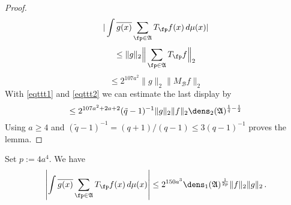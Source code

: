 \begin{proof}
 \begin{equation}
     |\int \overline{g(x)} \sum_{\fp \in \mathfrak{A}} T_{\fp} f(x)\, d\mu(x)|
\end{equation}
 \begin{equation}
     \le \|g\|_2 \Big\| \sum_{\fp \in \mathfrak{A}} T_{\fp} f \Big\|_2
\end{equation}
 \begin{equation}
     \le 2^{107a^2}\|g\|_2 \| M_{\mathcal{B}}f \|_2
\end{equation}
With \eqref{eqttt1} and
\eqref{eqttt2} we can estimate the last display by
\begin{equation}
    \le 2^{107a^2+2a+2}(\tilde{q}-1)^{-1} \|g\|_2 \|f\|_2\dens_2(\mathfrak{A})^{\frac 1{\tilde{q}}-\frac 12}
\end{equation}
Using $a\ge 4$ and
$(\tilde q - 1)^{-1} = (q+1)/(q-1) \le 3(q-1)^{-1}$
proves the lemma.
\end{proof}


\begin{lemma}\label{dens1-antichain}
Set $p:=4a^4$. We have
    \begin{equation}\label{eqttt3}
  \left|\int \overline{g(x)} \sum_{\fp \in \mathfrak{A}} T_{\fp} f(x)\, d\mu(x)\right|\le
   2^{150a^3}\dens_1(\mathfrak{A})^{\frac 1{2p}} \|f\|_2\|g\|_2\,.
\end{equation}
\end{lemma}



